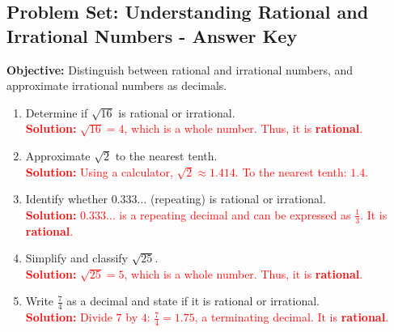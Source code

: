 \documentclass[10pt]{article}
\title{}
\date{}
\begin{document}
\subsection*{Problem Set: Understanding Rational and Irrational Numbers - Answer Key}
\onehalfspacing

\begin{tcolorbox}[colframe=black!40, colback=gray!5, 
coltitle=black, colbacktitle=black!20, fonttitle=\bfseries\Large, 
title=Learning Objective, halign title=center, left=5pt, right=5pt, top=5pt, bottom=15pt]
\textbf{Objective:} Distinguish between rational and irrational numbers, and approximate irrational numbers as decimals.
\end{tcolorbox}

\begin{tcolorbox}[colframe=black!60, colback=white, 
coltitle=black, colbacktitle=black!15, fonttitle=\bfseries\Large, 
title=Exercises, halign title=center, left=10pt, right=10pt, top=10pt, bottom=60pt]
\begin{enumerate}[itemsep=1em]
    \item Determine if \( \sqrt{16} \) is rational or irrational.\\
    \textcolor{red}{\textbf{Solution:} \( \sqrt{16} = 4 \), which is a whole number. Thus, it is \textbf{rational}.}

    \item Approximate \( \sqrt{2} \) to the nearest tenth.\\
    \textcolor{red}{\textbf{Solution:} Using a calculator, \( \sqrt{2} \approx 1.414 \). To the nearest tenth: \(1.4\).}

    \item Identify whether \( 0.333\ldots \) (repeating) is rational or irrational.\\
    \textcolor{red}{\textbf{Solution:} \( 0.333\ldots \) is a repeating decimal and can be expressed as \( \frac{1}{3} \). It is \textbf{rational}.}

    \item Simplify and classify \( \sqrt{25} \).\\
    \textcolor{red}{\textbf{Solution:} \( \sqrt{25} = 5 \), which is a whole number. Thus, it is \textbf{rational}.}

    \item Write \( \frac{7}{4} \) as a decimal and state if it is rational or irrational.\\
    \textcolor{red}{\textbf{Solution:} Divide \(7\) by \(4\): \( \frac{7}{4} = 1.75 \), a terminating decimal. It is \textbf{rational}.}


\end{enumerate}
\end{tcolorbox}
\end{document}
